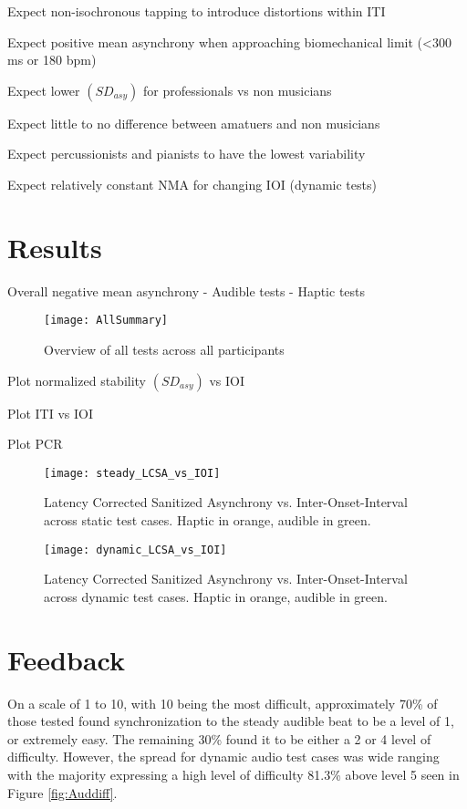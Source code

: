 Expect non-isochronous tapping to introduce distortions within ITI

Expect positive mean asynchrony when approaching biomechanical limit (<300 ms or 180 bpm)

Expect lower $(SD_{asy})$ for professionals vs non musicians

Expect little to no difference between amatuers and non musicians

Expect percussionists and pianists to have the lowest variability

Expect relatively constant NMA for changing IOI (dynamic tests)


\section{Results}
Overall negative mean asynchrony
- Audible tests
- Haptic tests

\begin{figure}[H]
    \centering
    \texttt{[image: AllSummary]}
    \caption{Overview of all tests across all participants}
    \label{fig:AllSummary}
\end{figure}

Plot normalized stability $(SD_{asy})$ vs IOI

Plot ITI vs IOI

Plot PCR
\begin{figure}[H]
    \centering
    \texttt{[image: steady\_LCSA\_vs\_IOI]}
    \caption{Latency Corrected Sanitized Asynchrony vs. Inter-Onset-Interval across static test cases. Haptic in orange, audible in green.}
    \label{fig:sLCSAvIOI}
\end{figure}

\begin{figure}[H]
    \centering
    \texttt{[image: dynamic\_LCSA\_vs\_IOI]}
    \caption{Latency Corrected Sanitized Asynchrony vs. Inter-Onset-Interval across dynamic test cases. Haptic in orange, audible in green.}
    \label{fig:dLCSAvIOI}
\end{figure}

\section{Feedback}
On a scale of 1 to 10, with 10 being the most difficult, approximately 70\% of those tested found synchronization to the steady audible beat to be a level of 1, or extremely easy. The remaining 30\% found it to be either a 2 or 4 level of difficulty. However, the spread for dynamic audio test cases was wide ranging with the majority expressing a high level of difficulty 81.3\% above level 5 seen in Figure \ref{fig:Auddiff}.

